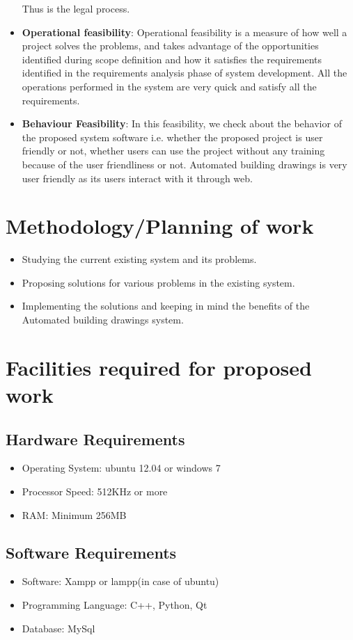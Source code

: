 \begin{itemize}
Thus is the legal process.
\item {\bf{Operational feasibility}}: Operational feasibility is a measure 
of how well a project solves the problems, and takes advantage of the 
opportunities identified during scope definition and how it satisfies 
the requirements identified in the requirements analysis phase of system 
development. All the operations performed in the system are very quick 
and satisfy all the requirements.
\item {\bf{Behaviour Feasibility}}: In this feasibility, we check about the 
behavior of the proposed system software i.e. whether the proposed 
project is user friendly or not, whether users can use the project 
without any training because of the user friendliness or not. Automated building drawings is very user friendly as its users interact with it 
through web.
\end{itemize}

\section{Methodology/Planning of work}
\begin{itemize}
\item Studying the current existing system and its problems.
\item Proposing solutions for various problems in the existing system.
\item Implementing the solutions and keeping in mind the benefits of the Automated building drawings system.
\end{itemize}

\section{Facilities required for proposed work}
\subsection{Hardware Requirements}
\begin{itemize}
\item Operating System: ubuntu 12.04 or windows 7
\item Processor Speed: 512KHz or more
\item RAM: Minimum 256MB
\end{itemize}
\subsection{Software Requirements}
\begin{itemize}
\item Software: Xampp or lampp(in case of ubuntu)
\item Programming Language: C++, Python, Qt
\item Database: MySql
\end{itemize}










